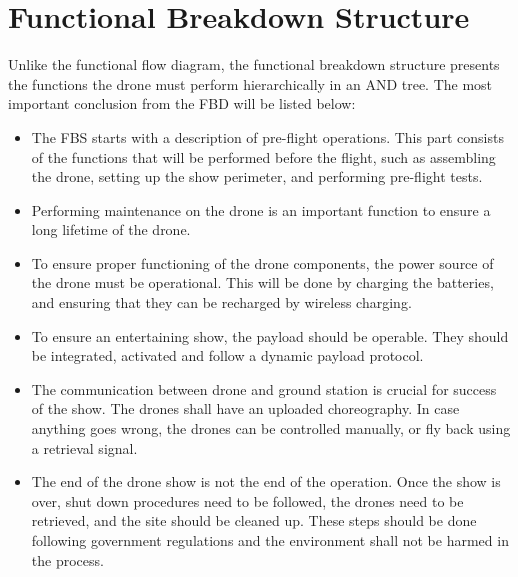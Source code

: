 \section{Functional Breakdown Structure}
\label{funcbreakstruc}
Unlike the functional flow diagram, the functional breakdown structure presents the functions the drone must perform hierarchically in an AND tree.
The most important conclusion from the FBD will be listed below:

\begin{itemize}[noitemsep,nolistsep]
    \item The FBS starts with a description of pre-flight operations. This part consists of the functions that will be performed before the flight, such as assembling the drone, setting up the show perimeter, and performing pre-flight tests.
    \item Performing maintenance on the drone is an important function to ensure a long lifetime of the drone.
    \item To ensure proper functioning of the drone components, the power source of the drone must be operational. This will be done by charging the batteries, and ensuring that they can be recharged by wireless charging.
    \item To ensure an entertaining show, the payload should be operable. They should be integrated, activated and follow a dynamic payload protocol. 
    \item The communication between drone and ground station is crucial for success of the show. The drones shall have an uploaded choreography. In case anything goes wrong, the drones can be controlled manually, or fly back using a retrieval signal.
    \item The end of the drone show is not the end of the operation. Once the show is over, shut down procedures need to be followed, the drones need to be retrieved, and the site should be cleaned up. These steps should be done following government regulations and the environment shall not be harmed in the process.
\end{itemize}

